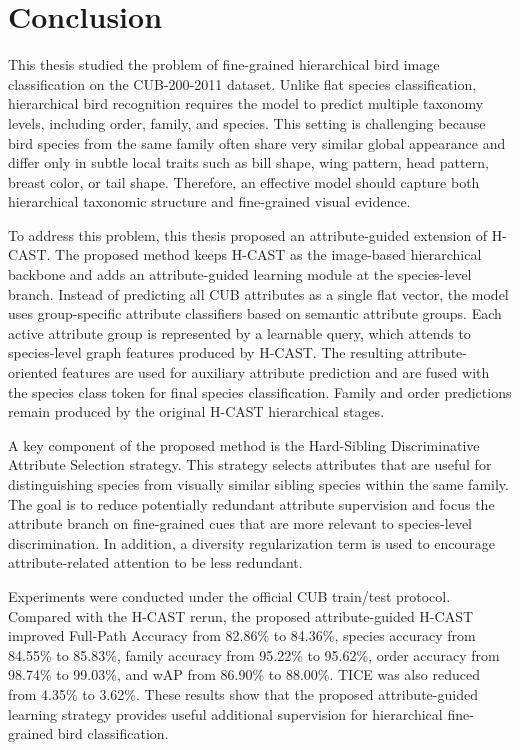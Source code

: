 \chapter*{Conclusion}


This thesis studied the problem of fine-grained hierarchical bird image classification on the CUB-200-2011 dataset. Unlike flat species classification, hierarchical bird recognition requires the model to predict multiple taxonomy levels, including order, family, and species. This setting is challenging because bird species from the same family often share very similar global appearance and differ only in subtle local traits such as bill shape, wing pattern, head pattern, breast color, or tail shape. Therefore, an effective model should capture both hierarchical taxonomic structure and fine-grained visual evidence.

To address this problem, this thesis proposed an attribute-guided extension of H-CAST. The proposed method keeps H-CAST as the image-based hierarchical backbone and adds an attribute-guided learning module at the species-level branch. Instead of predicting all CUB attributes as a single flat vector, the model uses group-specific attribute classifiers based on semantic attribute groups. Each active attribute group is represented by a learnable query, which attends to species-level graph features produced by H-CAST. The resulting attribute-oriented features are used for auxiliary attribute prediction and are fused with the species class token for final species classification. Family and order predictions remain produced by the original H-CAST hierarchical stages.

A key component of the proposed method is the Hard-Sibling Discriminative Attribute Selection strategy. This strategy selects attributes that are useful for distinguishing species from visually similar sibling species within the same family. The goal is to reduce potentially redundant attribute supervision and focus the attribute branch on fine-grained cues that are more relevant to species-level discrimination. In addition, a diversity regularization term is used to encourage attribute-related attention to be less redundant.

Experiments were conducted under the official CUB train/test protocol. Compared with the H-CAST rerun, the proposed attribute-guided H-CAST improved Full-Path Accuracy from 82.86\% to 84.36\%, species accuracy from 84.55\% to 85.83\%, family accuracy from 95.22\% to 95.62\%, order accuracy from 98.74\% to 99.03\%, and wAP from 86.90\% to 88.00\%. TICE was also reduced from 4.35\% to 3.62\%. These results show that the proposed attribute-guided learning strategy provides useful additional supervision for hierarchical fine-grained bird classification.

